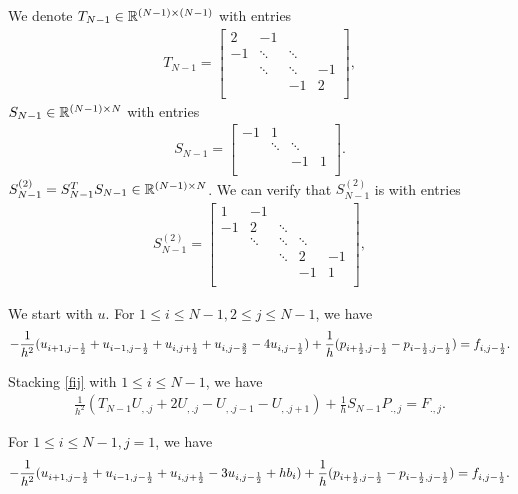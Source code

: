 \documentclass[english]{pkupaper}
\newenvironment{eqt}{\begin{equation}\begin{aligned}}{\end{aligned}\end{equation}}
\begin{document}
We denote $T_{N-1}\in \mathbb{R}^{(N-1)\times (N-1)}$ with entries
\begin{eqt}
T_{N-1}=\begin{bmatrix}
2&-1\\
-1&\ddots&\ddots\\
&\ddots&\ddots&-1\\
&&-1&2\\
\end{bmatrix},
\end{eqt}
$S_{N-1}\in \mathbb{R}^{(N-1)\times N}$ with entries
\begin{eqt}
S_{N-1}=\begin{bmatrix}
-1&1\\
&\ddots&\ddots\\
&&-1&1\\
\end{bmatrix}.
\end{eqt}
$S_{N-1}^{(2)}=S^T_{N-1}S_{N-1}\in \mathbb{R}^{(N-1)\times N}$. We can verify that $S_{N-1}^{(2)}$ is with entries
\begin{eqt}\label{s2}
S^{(2)}_{N-1}=\begin{bmatrix}
1&-1\\
-1&2&\ddots\\
&\ddots&\ddots&\ddots\\
&&\ddots&2&-1\\
&&&-1&1\\
\end{bmatrix},
\end{eqt}

We start with $u$. For $1\leq i \leq N-1, 2\leq j\leq N-1$, we have 
\begin{equation}
\label{fij}
-\frac{1}{h^2}(u_{i+1,j-\frac{1}{2}}+u_{i-1,j-\frac{1}{2}}+u_{i,j+\frac{1}{2}}+u_{i,j-\frac{3}{2}}-4u_{i,j-\frac{1}{2}})+\frac{1}{h}(p_{i+\frac{1}{2},j-\frac{1}{2}}-p_{i-\frac{1}{2},j-\frac{1}{2}})=f_{i,j-\frac{1}{2}}.
\end{equation}

Stacking \ref{fij} with $1\leq i\leq N-1$, we have 
\begin{eqt}
\label{fij2}
\frac{1}{h^2}\left(T_{N-1}U_{,.j}+2U_{,.j}-U_{,.j-1}-U_{,.j+1}\right)+\frac{1}{h}S_{N-1}P_{.,j}=F_{.,j}.
\end{eqt}

For $1\leq i \leq N-1, j=1$, we have 
\begin{eqt}
\label{bi}
-\frac{1}{h^2}(u_{i+1,j-\oot}+u_{i-1,j-\oot}+u_{i,j+\oot}-3u_{i,j-\oot}+hb_i)+\frac{1}{h}(p_{i+\oot,j-\oot}-p_{i-\oot,j-\oot})=f_{i,j-\oot}.
\end{eqt}
\end{document}
